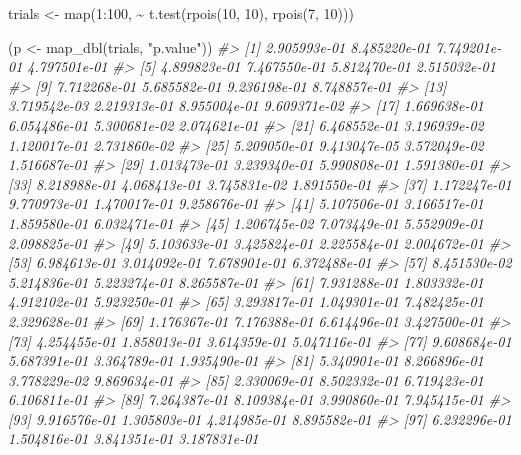 \documentclass[
]{book}
\newenvironment{Shaded}{\begin{snugshade}}{\end{snugshade}}
\newcommand{\CommentTok}[1]{\textcolor[rgb]{0.56,0.35,0.01}{\textit{#1}}}
\newcommand{\DecValTok}[1]{\textcolor[rgb]{0.00,0.00,0.81}{#1}}
\newcommand{\FunctionTok}[1]{\textcolor[rgb]{0.00,0.00,0.00}{#1}}
\newcommand{\NormalTok}[1]{#1}
\newcommand{\OtherTok}[1]{\textcolor[rgb]{0.56,0.35,0.01}{#1}}
\newcommand{\SpecialCharTok}[1]{\textcolor[rgb]{0.00,0.00,0.00}{#1}}
\newcommand{\StringTok}[1]{\textcolor[rgb]{0.31,0.60,0.02}{#1}}
\begin{document}
\begin{Shaded}
\begin{Highlighting}[]
\NormalTok{trials }\OtherTok{\textless{}{-}} \FunctionTok{map}\NormalTok{(}\DecValTok{1}\SpecialCharTok{:}\DecValTok{100}\NormalTok{, }\SpecialCharTok{\textasciitilde{}} \FunctionTok{t.test}\NormalTok{(}\FunctionTok{rpois}\NormalTok{(}\DecValTok{10}\NormalTok{, }\DecValTok{10}\NormalTok{), }\FunctionTok{rpois}\NormalTok{(}\DecValTok{7}\NormalTok{, }\DecValTok{10}\NormalTok{)))}

\NormalTok{(p }\OtherTok{\textless{}{-}} \FunctionTok{map\_dbl}\NormalTok{(trials, }\StringTok{"p.value"}\NormalTok{))}
\CommentTok{\#\textgreater{}   [1] 2.905993e{-}01 8.485220e{-}01 7.749201e{-}01 4.797501e{-}01}
\CommentTok{\#\textgreater{}   [5] 4.899823e{-}01 7.467550e{-}01 5.812470e{-}01 2.515032e{-}01}
\CommentTok{\#\textgreater{}   [9] 7.712268e{-}01 5.685582e{-}01 9.236198e{-}01 8.748857e{-}01}
\CommentTok{\#\textgreater{}  [13] 3.719542e{-}03 2.219313e{-}01 8.955004e{-}01 9.609371e{-}02}
\CommentTok{\#\textgreater{}  [17] 1.669638e{-}01 6.054486e{-}01 5.300681e{-}02 2.074621e{-}01}
\CommentTok{\#\textgreater{}  [21] 6.468552e{-}01 3.196939e{-}02 1.120017e{-}01 2.731860e{-}02}
\CommentTok{\#\textgreater{}  [25] 5.209050e{-}01 9.413047e{-}05 3.572049e{-}02 1.516687e{-}01}
\CommentTok{\#\textgreater{}  [29] 1.013473e{-}01 3.239340e{-}01 5.990808e{-}01 1.591380e{-}01}
\CommentTok{\#\textgreater{}  [33] 8.218988e{-}01 4.068413e{-}01 3.745831e{-}02 1.891550e{-}01}
\CommentTok{\#\textgreater{}  [37] 1.172247e{-}01 9.770973e{-}01 1.470017e{-}01 9.258676e{-}01}
\CommentTok{\#\textgreater{}  [41] 5.107506e{-}01 3.166517e{-}01 1.859580e{-}01 6.032471e{-}01}
\CommentTok{\#\textgreater{}  [45] 1.206745e{-}02 7.073449e{-}01 5.552909e{-}01 2.098825e{-}01}
\CommentTok{\#\textgreater{}  [49] 5.103633e{-}01 3.425824e{-}01 2.225584e{-}01 2.004672e{-}01}
\CommentTok{\#\textgreater{}  [53] 6.984613e{-}01 3.014092e{-}01 7.678901e{-}01 6.372488e{-}01}
\CommentTok{\#\textgreater{}  [57] 8.451530e{-}02 5.214836e{-}01 5.223274e{-}01 8.265587e{-}01}
\CommentTok{\#\textgreater{}  [61] 7.931288e{-}01 1.803332e{-}01 4.912102e{-}01 5.923250e{-}01}
\CommentTok{\#\textgreater{}  [65] 3.293817e{-}01 1.049301e{-}01 7.482425e{-}01 2.329628e{-}01}
\CommentTok{\#\textgreater{}  [69] 1.176367e{-}01 7.176388e{-}01 6.614496e{-}01 3.427500e{-}01}
\CommentTok{\#\textgreater{}  [73] 4.254455e{-}01 1.858013e{-}01 3.614359e{-}01 5.047116e{-}01}
\CommentTok{\#\textgreater{}  [77] 9.608684e{-}01 5.687391e{-}01 3.364789e{-}01 1.935490e{-}01}
\CommentTok{\#\textgreater{}  [81] 5.340901e{-}01 8.266896e{-}01 3.778229e{-}02 9.869634e{-}01}
\CommentTok{\#\textgreater{}  [85] 2.330069e{-}01 8.502332e{-}01 6.719423e{-}01 6.106811e{-}01}
\CommentTok{\#\textgreater{}  [89] 7.264387e{-}01 8.109384e{-}01 3.990860e{-}01 7.945415e{-}01}
\CommentTok{\#\textgreater{}  [93] 9.916576e{-}01 1.305803e{-}01 4.214985e{-}01 8.895582e{-}01}
\CommentTok{\#\textgreater{}  [97] 6.232296e{-}01 1.504816e{-}01 3.841351e{-}01 3.187831e{-}01}
\end{Highlighting}
\end{Shaded}
\end{document}
